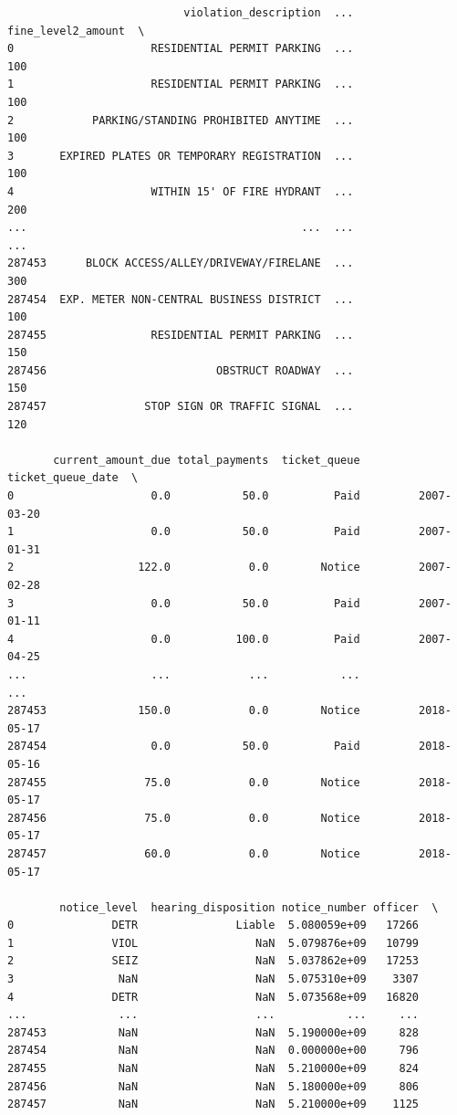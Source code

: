 \documentclass[
  letterpaper,
  DIV=11,
  numbers=noendperiod]{scrartcl}
\begin{document}
\begin{verbatim}
                           violation_description  ...  fine_level2_amount  \
0                     RESIDENTIAL PERMIT PARKING  ...                 100   
1                     RESIDENTIAL PERMIT PARKING  ...                 100   
2            PARKING/STANDING PROHIBITED ANYTIME  ...                 100   
3       EXPIRED PLATES OR TEMPORARY REGISTRATION  ...                 100   
4                     WITHIN 15' OF FIRE HYDRANT  ...                 200   
...                                          ...  ...                 ...   
287453      BLOCK ACCESS/ALLEY/DRIVEWAY/FIRELANE  ...                 300   
287454  EXP. METER NON-CENTRAL BUSINESS DISTRICT  ...                 100   
287455                RESIDENTIAL PERMIT PARKING  ...                 150   
287456                          OBSTRUCT ROADWAY  ...                 150   
287457               STOP SIGN OR TRAFFIC SIGNAL  ...                 120   

       current_amount_due total_payments  ticket_queue  ticket_queue_date  \
0                     0.0           50.0          Paid         2007-03-20   
1                     0.0           50.0          Paid         2007-01-31   
2                   122.0            0.0        Notice         2007-02-28   
3                     0.0           50.0          Paid         2007-01-11   
4                     0.0          100.0          Paid         2007-04-25   
...                   ...            ...           ...                ...   
287453              150.0            0.0        Notice         2018-05-17   
287454                0.0           50.0          Paid         2018-05-16   
287455               75.0            0.0        Notice         2018-05-17   
287456               75.0            0.0        Notice         2018-05-17   
287457               60.0            0.0        Notice         2018-05-17   

        notice_level  hearing_disposition notice_number officer  \
0               DETR               Liable  5.080059e+09   17266   
1               VIOL                  NaN  5.079876e+09   10799   
2               SEIZ                  NaN  5.037862e+09   17253   
3                NaN                  NaN  5.075310e+09    3307   
4               DETR                  NaN  5.073568e+09   16820   
...              ...                  ...           ...     ...   
287453           NaN                  NaN  5.190000e+09     828   
287454           NaN                  NaN  0.000000e+00     796   
287455           NaN                  NaN  5.210000e+09     824   
287456           NaN                  NaN  5.180000e+09     806   
287457           NaN                  NaN  5.210000e+09    1125   


\end{verbatim}
\end{document}
